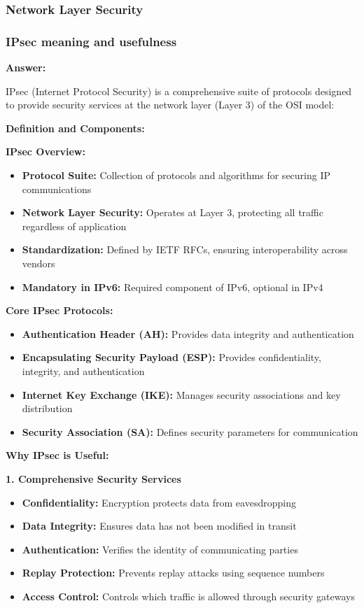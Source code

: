 \documentclass[12pt,a4paper]{article}
\begin{document}
\subsubsection{Network Layer Security}

\subsubsection{IPsec meaning and usefulness}

\textbf{Answer:}

IPsec (Internet Protocol Security) is a comprehensive suite of protocols designed to provide security services at the network layer (Layer 3) of the OSI model:

\textbf{Definition and Components:}

\textbf{IPsec Overview:}
\begin{itemize}
    \item \textbf{Protocol Suite:} Collection of protocols and algorithms for securing IP communications
    \item \textbf{Network Layer Security:} Operates at Layer 3, protecting all traffic regardless of application
    \item \textbf{Standardization:} Defined by IETF RFCs, ensuring interoperability across vendors
    \item \textbf{Mandatory in IPv6:} Required component of IPv6, optional in IPv4
\end{itemize}

\textbf{Core IPsec Protocols:}
\begin{itemize}
    \item \textbf{Authentication Header (AH):} Provides data integrity and authentication
    \item \textbf{Encapsulating Security Payload (ESP):} Provides confidentiality, integrity, and authentication
    \item \textbf{Internet Key Exchange (IKE):} Manages security associations and key distribution
    \item \textbf{Security Association (SA):} Defines security parameters for communication
\end{itemize}

\textbf{Why IPsec is Useful:}

\textbf{1. Comprehensive Security Services}
\begin{itemize}
    \item \textbf{Confidentiality:} Encryption protects data from eavesdropping
    \item \textbf{Data Integrity:} Ensures data has not been modified in transit
    \item \textbf{Authentication:} Verifies the identity of communicating parties
    \item \textbf{Replay Protection:} Prevents replay attacks using sequence numbers
    \item \textbf{Access Control:} Controls which traffic is allowed through security gateways
\end{itemize}
\end{document}
